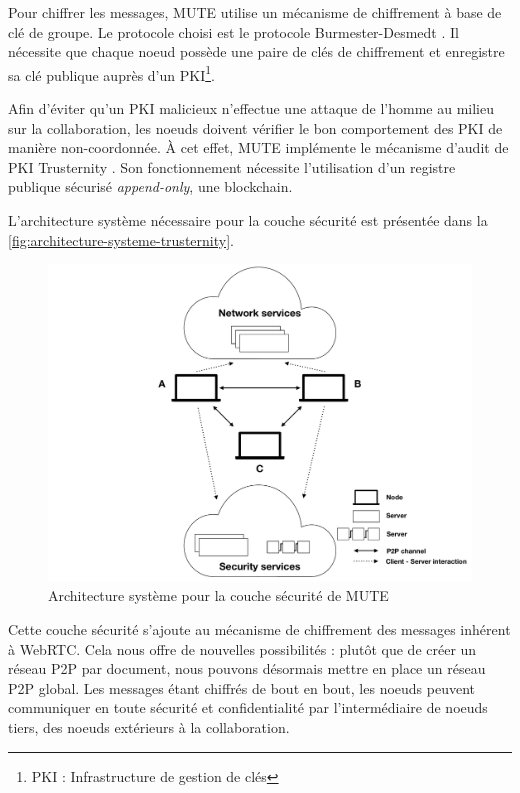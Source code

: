 Pour chiffrer les messages, MUTE utilise un mécanisme de chiffrement à base de clé de groupe.
Le protocole choisi est le protocole Burmester-Desmedt \cite{1995-burmester-desmedt}.
Il nécessite que chaque noeud possède une paire de clés de chiffrement et enregistre sa clé publique auprès d'un PKI\footnote{\acf{PKI} : Infrastructure de gestion de clés}.

Afin d'éviter qu'un \ac{PKI} malicieux n'effectue une attaque de l'homme au milieu sur la collaboration, les noeuds doivent vérifier le bon comportement des PKI de manière non-coordonnée.
À cet effet, MUTE implémente le mécanisme d'audit de PKI Trusternity \cite{2018-trusternity-short, 2018-trusternity-long}.
Son fonctionnement nécessite l'utilisation d'un registre publique sécurisé \emph{append-only}, \ie une blockchain.

L'architecture système nécessaire pour la couche sécurité est présentée dans la \autoref{fig:architecture-systeme-trusternity}.

\begin{figure}[!ht]
  \centering
  \includegraphics[page=4, trim=3cm 1cm 4cm 1cm, clip, width=.7\linewidth]{img/mute-figures.pdf}
  \caption{Architecture système pour la couche sécurité de MUTE}
  \label{fig:architecture-systeme-trusternity}
\end{figure}

Cette couche sécurité s'ajoute au mécanisme de chiffrement des messages inhérent à \ac{WebRTC}.
Cela nous offre de nouvelles possibilités : plutôt que de créer un réseau \ac{P2P} par document, nous pouvons désormais mettre en place un réseau \ac{P2P} global.
Les messages étant chiffrés de bout en bout, les noeuds peuvent communiquer en toute sécurité et confidentialité par l'intermédiaire de noeuds tiers, \ie des noeuds extérieurs à la collaboration.

